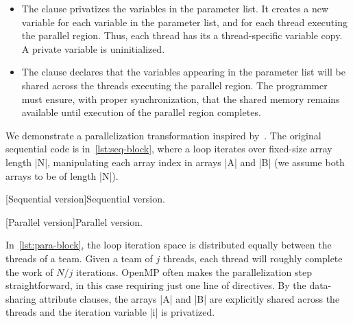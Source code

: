 \begin{itemize}

\item The  clause privatizes the variables in the parameter list.
It creates a new variable for each variable in the parameter list, and for each thread executing the parallel region.
Thus, each thread has its a thread-specific variable copy.
A private variable is uninitialized.

\item The  clause declares that the variables appearing in the parameter list will be shared across the threads executing the parallel region.
The programmer must ensure, with proper synchronization, that the shared memory remains available until execution of the parallel region completes.

\end{itemize}

\begin{example}\label{ex:seq-transformation}

We demonstrate a parallelization transformation inspired by~\textcite{singal2019}.
The original sequential code is in~\autoref{lst:seq-block}, where a loop iterates over
fixed-size array length \pr|N|, manipulating each array index in arrays \pr|A| and \pr|B|
(we assume both arrays to be of length \pr|N|).

\begin{center}
\begin{minipage}{\textwidth}
\begin{minipage}{.45\textwidth}
[Sequential version]{Sequential version.}
\label{lst:seq-block}
\end{minipage}\hfill%
\begin{minipage}{.45\textwidth}
[Parallel version]{Parallel version.}
\label{lst:para-block}
\end{minipage}
\end{minipage}
\end{center}

In~\autoref{lst:para-block}, the loop iteration space is distributed equally between the threads of a team.
Given a team of \(j\) threads, each thread will roughly complete the work of \(N/j\) iterations.
OpenMP often makes the parallelization step straightforward, in this case requiring just one line of directives.
By the data-sharing attribute clauses, the arrays \pr|A| and \pr|B| are explicitly shared across
the threads and the iteration variable \pr|i| is privatized.
\end{example}

